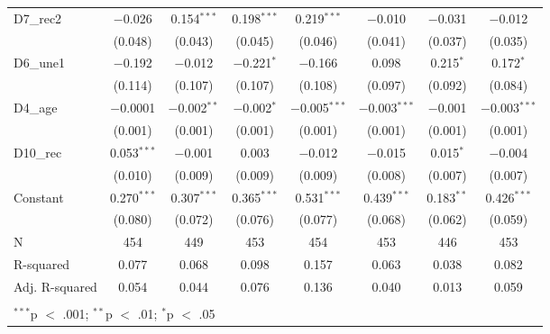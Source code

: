 \documentclass[
]{article}
\begin{document}
\begin{table}[!htbp]
\begin{tabular}{@{\extracolsep{5pt}}lccccccc}
  D7\_rec2 & $-$0.026 & 0.154$^{***}$ & 0.198$^{***}$ & 0.219$^{***}$ & $-$0.010 & $-$0.031 & $-$0.012 \\ 
  & (0.048) & (0.043) & (0.045) & (0.046) & (0.041) & (0.037) & (0.035) \\ 
  D6\_une1 & $-$0.192 & $-$0.012 & $-$0.221$^{*}$ & $-$0.166 & 0.098 & 0.215$^{*}$ & 0.172$^{*}$ \\ 
  & (0.114) & (0.107) & (0.107) & (0.108) & (0.097) & (0.092) & (0.084) \\ 
  D4\_age & $-$0.0001 & $-$0.002$^{**}$ & $-$0.002$^{*}$ & $-$0.005$^{***}$ & $-$0.003$^{***}$ & $-$0.001 & $-$0.003$^{***}$ \\ 
  & (0.001) & (0.001) & (0.001) & (0.001) & (0.001) & (0.001) & (0.001) \\ 
  D10\_rec & 0.053$^{***}$ & $-$0.001 & 0.003 & $-$0.012 & $-$0.015 & 0.015$^{*}$ & $-$0.004 \\ 
  & (0.010) & (0.009) & (0.009) & (0.009) & (0.008) & (0.007) & (0.007) \\ 
  Constant & 0.270$^{***}$ & 0.307$^{***}$ & 0.365$^{***}$ & 0.531$^{***}$ & 0.439$^{***}$ & 0.183$^{**}$ & 0.426$^{***}$ \\ 
  & (0.080) & (0.072) & (0.076) & (0.077) & (0.068) & (0.062) & (0.059) \\ 
 N & 454 & 449 & 453 & 454 & 453 & 446 & 453 \\ 
R-squared & 0.077 & 0.068 & 0.098 & 0.157 & 0.063 & 0.038 & 0.082 \\ 
Adj. R-squared & 0.054 & 0.044 & 0.076 & 0.136 & 0.040 & 0.013 & 0.059 \\ 
\hline \\[-1.8ex] 
\multicolumn{8}{l}{$^{***}$p $<$ .001; $^{**}$p $<$ .01; $^{*}$p $<$ .05} \\ 
\end{tabular} 
\end{table}
\end{document}
